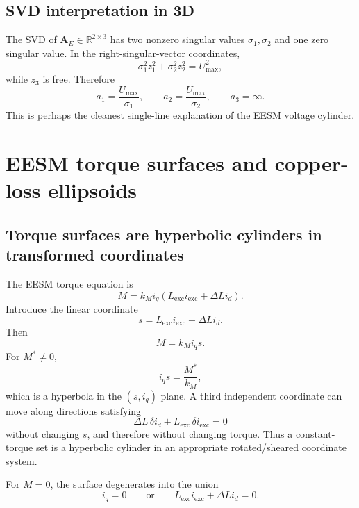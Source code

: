 \documentclass[11pt,a4paper]{article}
\newcommand{\id}{i_d}
\newcommand{\iq}{i_q}
\newcommand{\ie}{i_{\mathrm{exc}}}
\newcommand{\Lexc}{L_{\mathrm{exc}}}
\newcommand{\Umax}{U_{\max}}
\newcommand{\R}{\mathbb{R}}
\newcommand{\mat}[1]{\bm{#1}}
\begin{document}
\subsection{SVD interpretation in 3D}

The SVD of $\mat A_E\in\R^{2\times3}$ has two nonzero singular values $\sigma_1,\sigma_2$ and one zero singular value. In the right-singular-vector coordinates,
\begin{equation}
  \sigma_1^2z_1^2+\sigma_2^2z_2^2=\Umax^2,
\end{equation}
while $z_3$ is free. Therefore
\begin{equation}
  a_1=\frac{\Umax}{\sigma_1},
  \qquad
  a_2=\frac{\Umax}{\sigma_2},
  \qquad
  a_3=\infty.
\end{equation}
This is perhaps the cleanest single-line explanation of the EESM voltage cylinder.

\section{EESM torque surfaces and copper-loss ellipsoids}

\subsection{Torque surfaces are hyperbolic cylinders in transformed coordinates}

The EESM torque equation is
\begin{equation}
  M=k_M\iq(\Lexc\ie+\Delta L\id).
\end{equation}
Introduce the linear coordinate
\begin{equation}
  s=\Lexc\ie+\Delta L\id.
\end{equation}
Then
\begin{equation}
  M=k_M\iq s.
\end{equation}
For $M^*\neq0$,
\begin{equation}
  \iq s=\frac{M^*}{k_M},
\end{equation}
which is a hyperbola in the $(s,\iq)$ plane. A third independent coordinate can move along directions satisfying
\begin{equation}
  \Delta L\,\delta i_d+\Lexc\,\delta i_{\mathrm{exc}}=0
\end{equation}
without changing $s$, and therefore without changing torque. Thus a constant-torque set is a hyperbolic cylinder in an appropriate rotated/sheared coordinate system.

For $M=0$, the surface degenerates into the union
\begin{equation}
  \iq=0
  \qquad\text{or}\qquad
  \Lexc\ie+\Delta L\id=0.
\end{equation}
\end{document}
